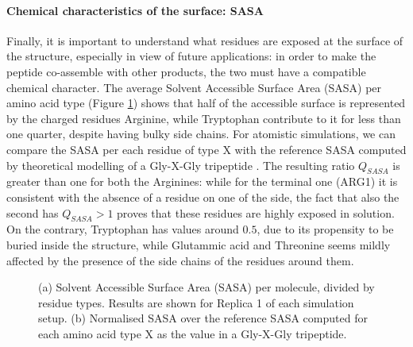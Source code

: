 \paragraph{Chemical characteristics of the surface: SASA} Finally, it is important to understand what residues are exposed at the surface of the structure, especially in view of future applications: in order to make the peptide co-assemble with other products, the two must have a compatible chemical character. The average Solvent Accessible Surface Area (SASA) per amino acid type (Figure \ref{fig:BTI_sasa_exposed}) shows that half of the accessible surface is represented by the charged residues Arginine, while Tryptophan contribute to it for less than one quarter, despite having bulky side chains.
%
For atomistic simulations, we can compare the SASA per each residue of type X with the reference SASA computed by theoretical modelling of a Gly-X-Gly tripeptide \citep{Tien2013}. The resulting ratio $Q_{SASA}$ is greater than one for both the Arginines: while for the terminal one (ARG1) it is consistent with the absence of a residue on one of the side, the fact that also the second has $Q_{SASA}>1$ proves that these residues are highly exposed in solution. On the contrary, Tryptophan has values around $0.5$, due to its propensity to be buried inside the structure, while Glutammic acid and Threonine seems mildly affected by the presence of the side chains of the residues around them.
\begin{figure}[t]
\centering
{} 
\caption[SASA per residue of a buckyball in solution]{(a) Solvent Accessible Surface Area (SASA) per molecule, divided by residue types. Results are shown for Replica 1 of each simulation setup. (b) Normalised SASA over the reference SASA computed for each amino acid type X as the value in a Gly-X-Gly tripeptide.}
\label{fig:BTI_sasa_exposed}
\end{figure}

